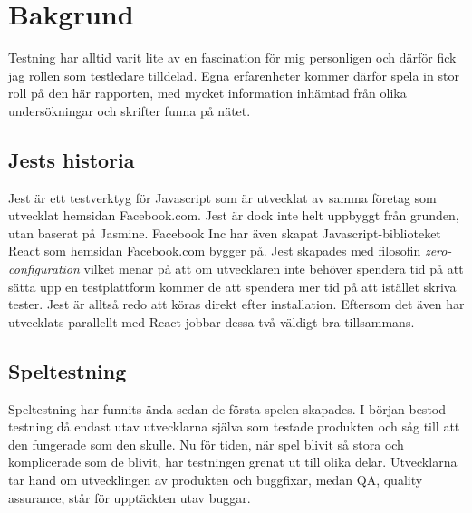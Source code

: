 \section{Bakgrund}
\label{sec:david-background}
Testning har alltid varit lite av en fascination för mig personligen och därför fick jag rollen som testledare tilldelad. Egna erfarenheter kommer därför spela in stor roll på den här rapporten, med mycket information inhämtad från olika undersökningar och skrifter funna på nätet.

\subsection{Jests historia}
Jest är ett testverktyg för Javascript som är utvecklat av samma företag som utvecklat hemsidan Facebook.com. Jest är dock inte helt uppbyggt från grunden, utan baserat på Jasmine. Facebook Inc har även skapat Javascript-biblioteket React\cite{bib-react} som hemsidan Facebook.com bygger på. Jest skapades med filosofin \textit{zero-configuration} vilket menar på att om utvecklaren inte behöver spendera tid på att sätta upp en testplattform kommer de att spendera mer tid på att istället skriva tester. Jest är alltså redo att köras direkt efter installation. Eftersom det även har utvecklats parallellt med React jobbar dessa två väldigt bra tillsammans.

\subsection{Speltestning}
Speltestning har funnits ända sedan de första spelen skapades. I början bestod testning då endast utav utvecklarna själva som testade produkten och såg till att den fungerade som den skulle. Nu för tiden, när spel blivit så stora och komplicerade som de blivit, har testningen grenat ut till olika delar. Utvecklarna tar hand om utvecklingen av produkten och buggfixar, medan QA, quality assurance, står för upptäckten utav buggar\cite{bib-quality-assured}. 
